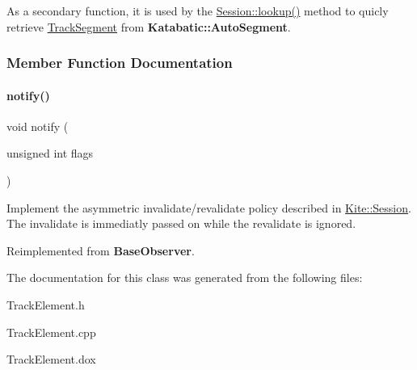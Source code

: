 As a secondary function, it is used by the \mbox{\hyperlink{classKite_1_1Session_a1728621b96081c32fb7bfb18a0ebfad3}{Session\+::lookup()}} method to quicly retrieve \mbox{\hyperlink{classKite_1_1TrackSegment}{Track\+Segment}} from \textbf{ Katabatic\+::\+Auto\+Segment}. 

\subsubsection{Member Function Documentation}
\mbox{\label{classKite_1_1SegmentObserver_a52e577fb0c4f2e3650928334fb621c2f}} 
\paragraph{\texorpdfstring{notify()}{notify()}}
{\footnotesize\ttfamily void notify (\begin{DoxyParamCaption}\item[{unsigned int}]{flags }\end{DoxyParamCaption})\hspace{0.3cm}{\ttfamily [virtual]}}

Implement the asymmetric invalidate/revalidate policy described in \mbox{\hyperlink{classKite_1_1Session}{Kite\+::\+Session}}. The invalidate is immediatly passed on while the revalidate is ignored. 

Reimplemented from \textbf{ Base\+Observer}.



The documentation for this class was generated from the following files\+:\begin{DoxyCompactItemize}
\item 
Track\+Element.\+h\item 
Track\+Element.\+cpp\item 
Track\+Element.\+dox\end{DoxyCompactItemize}
